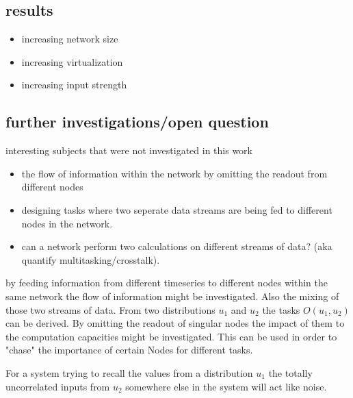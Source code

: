 \subsection{results}
	\begin{itemize}
		\item increasing network size
		\item increasing virtualization
		\item increasing input strength
	\end{itemize}

\subsection{further investigations/open question}
	interesting subjects that were not investigated in this work
	\begin{itemize}
		\item the flow of information within the network by omitting the readout from different nodes
		\item designing tasks where two seperate data streams are being fed to different nodes in the network.
		\item can a network perform two calculations on different streams of data? (aka quantify multitasking/crosstalk).
	\end{itemize}

by feeding information from different timeseries to different nodes within the same network the flow of information might be investigated. Also the mixing of those two streams of data. From two distributions $u_1$ and $u_2$ the tasks $O(u_1,u_2)$ can be derived. By omitting the readout of singular nodes the impact of them to the computation capacities might be investigated. This can be used in order to "chase" the importance of certain Nodes for different tasks.



For a system trying to recall the values from a distribution $u_1$ the totally uncorrelated inputs from $u_2$ somewhere else in the system will act like noise. 
